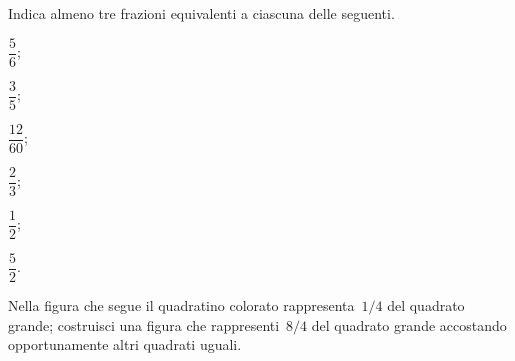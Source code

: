 \begin{esercizio}
 \label{ese:3.9}
 Indica almeno tre frazioni equivalenti a ciascuna delle seguenti.
 \begin{multicols}{6}
 \begin{enumeratea}
 	\item $\dfrac{5}{6}$;
 	\item $\dfrac{3}{5}$;
 	\item $\dfrac{12}{60}$;
 	\item $\dfrac{2}{3}$;
 	\item $\dfrac{1}{2}$;
 	\item $\dfrac{5}{2}$.
 \end{enumeratea}
 \end{multicols}
\end{esercizio}

\begin{esercizio}
 \label{ese:3.10}
Nella figura che segue il quadratino colorato rappresenta~$1/4$ del quadrato grande; costruisci una figura
che rappresenti~$8/4$ del quadrato grande accostando opportunamente altri quadrati uguali.
 \begin{center}
 
 \end{center}
\end{esercizio}

